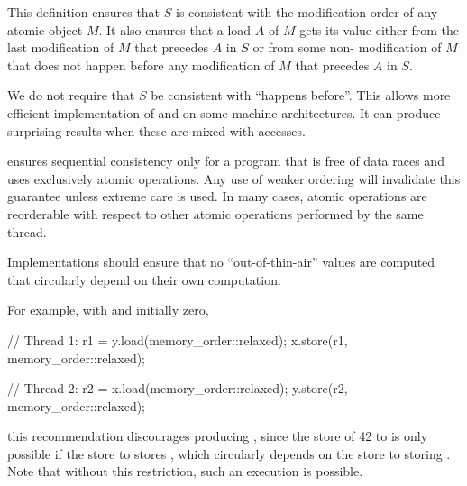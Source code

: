 \pnum
\begin{note}
This definition ensures that $S$ is consistent with
the modification order of any atomic object $M$.
It also ensures that
a  load $A$ of $M$
gets its value either from the last modification of $M$
that precedes $A$ in $S$ or
from some non- modification of $M$
that does not happen before any modification of $M$
that precedes $A$ in $S$.
\end{note}

\pnum
\begin{note}
We do not require that $S$ be consistent with
``happens before''.
This allows more efficient implementation
of  and 
on some machine architectures.
It can produce surprising results
when these are mixed with  accesses.
\end{note}

\pnum
\begin{note}
 ensures sequential consistency only
for a program that is free of data races and
uses exclusively  atomic operations.
Any use of weaker ordering will invalidate this guarantee
unless extreme care is used.
In many cases,  atomic operations are reorderable
with respect to other atomic operations performed by the same thread.
\end{note}

\pnum
Implementations should ensure that no ``out-of-thin-air'' values are computed that
circularly depend on their own computation.

\begin{note}
For example, with  and  initially zero,
\begin{codeblock}
// Thread 1:
r1 = y.load(memory_order::relaxed);
x.store(r1, memory_order::relaxed);
\end{codeblock}

\begin{codeblock}
// Thread 2:
r2 = x.load(memory_order::relaxed);
y.store(r2, memory_order::relaxed);
\end{codeblock}
this recommendation discourages producing , since the store of 42 to  is only
possible if the store to  stores , which circularly depends on the
store to  storing . Note that without this restriction, such an
execution is possible.
\end{note}

